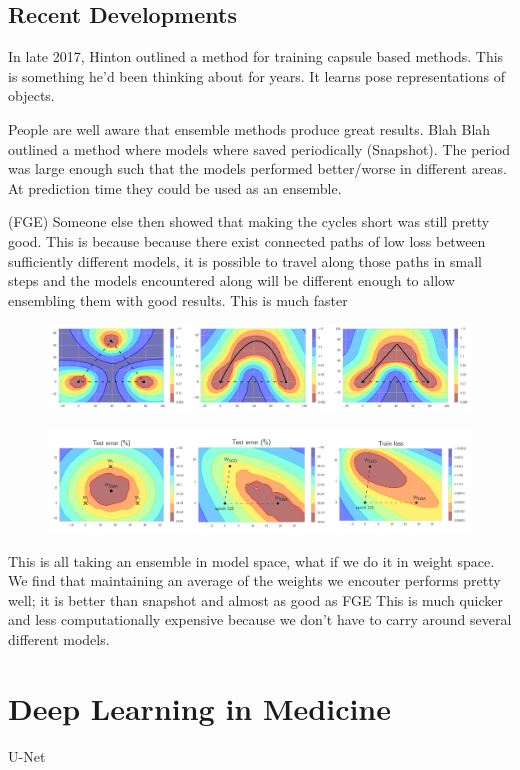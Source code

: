 \subsection{Recent Developments}\label{subsec:recent_improvements}
In late 2017, Hinton outlined a method for training capsule based methods.
This is something he'd been thinking about for years.
It learns pose representations of objects.

People are well aware that ensemble methods produce great results.
Blah Blah outlined a method where models where saved periodically (Snapshot).
The period was large enough such that the models performed better/worse in different areas.
At prediction time they could be used as an ensemble.

(FGE) Someone else then showed that making the cycles short was still pretty good.
This is because because there exist connected paths of low loss between sufficiently different models, it is possible to travel along those paths in small steps and the models encountered along will be different enough to allow ensembling them with good results.
This is much faster



\begin{figure}
    \centering
    \includegraphics[width=\textwidth]{./img/FGE.png}
    \caption{\cite{Garipov_Izmailov_Podoprikhin_Vetrov_Wilson_2018}}
    \label{fig:FGE_shortest_path}
\end{figure}

\begin{figure}
    \centering
    \includegraphics[width=\textwidth]{./img/SWA.png}
    \caption{\cite{Izmailov_Podoprikhin_Garipov_Vetrov_Wilson_2018}}
    \label{fig:SWA}
\end{figure}

This is all taking an ensemble in model space, what if we do it in weight space.
We find that maintaining an average of the weights we encouter performs pretty well; it is better than snapshot and almost as good as FGE
This is much quicker and less computationally expensive because we don't have to carry around several different models.

\section{Deep Learning in Medicine}\label{deep_learning_medic_lit}
U-Net \cite{Ronneberger_Fischer_Brox_2015}